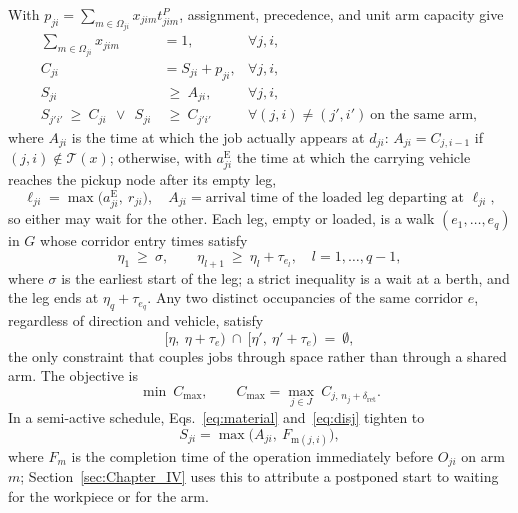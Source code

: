 \documentclass[preprint,review,12pt,authoryear,doubleblind]{elsarticle}
\begin{document}
With $p_{ji}=\sum_{m\in\Omega_{ji}}x_{jim}t^P_{jim}$, assignment, precedence, and unit arm capacity give
\begin{align}
\sum_{m\in\Omega_{ji}} x_{jim} &= 1, & \forall j,i,
\label{eq:assign}\\
C_{ji} &= S_{ji}+p_{ji}, & \forall j,i,
\label{eq:dur}\\
S_{ji} &\ \ge\ A_{ji}, & \forall j,i,
\label{eq:material}\\
S_{j'i'}\ \ge\ C_{ji}\ \ \vee\ \ S_{ji} &\ \ge\ C_{j'i'}
& \forall (j,i)\neq(j',i')\ \text{on the same arm},
\label{eq:disj}
\end{align}
where $A_{ji}$ is the time at which the job actually appears at $d_{ji}$: $A_{ji}=C_{j,i-1}$ if $(j,i)\notin\mathcal{T}(x)$; otherwise, with $a^{\mathrm{E}}_{ji}$ the time at which the carrying vehicle reaches the pickup node after its empty leg,
\begin{equation}
\label{eq:load}
\ell_{ji}=\max\bigl(a^{\mathrm{E}}_{ji},\ r_{ji}\bigr),
\quad
A_{ji}=\text{arrival time of the loaded leg departing at } \ell_{ji},
\end{equation}
so either may wait for the other.
Each leg, empty or loaded, is a walk $(e_1,\dots,e_q)$ in $G$ whose corridor entry times satisfy
\begin{equation}
\label{eq:walk}
\eta_1 \ \ge\ \sigma, \qquad
\eta_{l+1}\ \ge\ \eta_l+\tau_{e_l}, \quad l=1,\dots,q-1,
\end{equation}
where $\sigma$ is the earliest start of the leg; a strict inequality is a wait at a berth, and the leg ends at $\eta_q+\tau_{e_q}$.
Any two distinct occupancies of the same corridor $e$, regardless of direction and vehicle, satisfy
\begin{equation}
\label{eq:excl}
\bigl[\eta,\ \eta+\tau_e\bigr)\ \cap\
\bigl[\eta',\ \eta'+\tau_e\bigr)\ =\ \emptyset ,
\end{equation}
the only constraint that couples jobs through space rather than through a shared arm. The objective is
\begin{equation}
\label{eq:obj}
\min\ C_{\max},\qquad
C_{\max}=\max_{j\in J}\ C_{j,\,n_j+\delta_{\mathrm{ret}}} .
\end{equation}
In a semi-active schedule, Eqs.~\eqref{eq:material} and~\eqref{eq:disj} tighten to
\begin{equation}
\label{eq:bind}
S_{ji}=\max\bigl(A_{ji},\ F_{\mathrm{m}(j,i)}\bigr),
\end{equation}
where $F_m$ is the completion time of the operation immediately before $O_{ji}$ on arm $m$; Section~\ref{sec:Chapter_IV} uses this to attribute a postponed start to waiting for the workpiece or for the arm.
\end{document}
